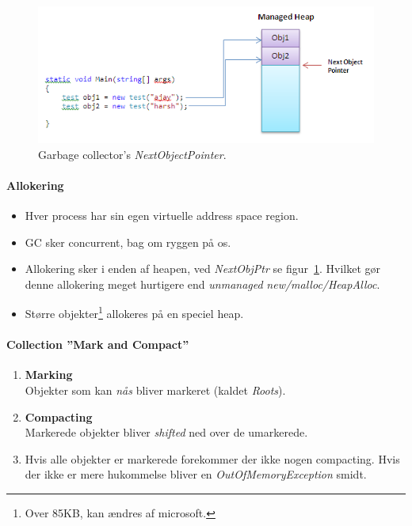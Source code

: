 \begin{figure}[h]
	\centering
	\includegraphics[width=\linewidth]{figs/nextobjptr}
	\caption{Garbage collector's \textit{NextObjectPointer}.}
	\label{fig:nextobjptr}
\end{figure}

\paragraph{Allokering}
\begin{itemize}
	\item Hver process har sin egen virtuelle address space region.
	\item GC sker concurrent, bag om ryggen på os.
	\item Allokering sker i enden af heapen, ved \textit{NextObjPtr} se figur~\ref{fig:nextobjptr}. Hvilket gør denne allokering meget hurtigere end \textit{unmanaged} \textit{new/malloc/HeapAlloc}.
	\item Større objekter\footnote{Over 85KB, kan ændres af microsoft.} allokeres på en speciel heap.
\end{itemize}

\paragraph{Collection ''Mark and Compact''}
\begin{enumerate}
	\item \textbf{Marking}\\
	Objekter som kan \textit{nås} bliver markeret (kaldet \textit{Roots}).
	\item \textbf{Compacting}\\
	Markerede objekter bliver \textit{shifted} ned over de umarkerede.
	\item Hvis alle objekter er markerede forekommer der ikke nogen compacting. Hvis der ikke er mere hukommelse bliver en \textit{OutOfMemoryException} smidt.
\end{enumerate}

